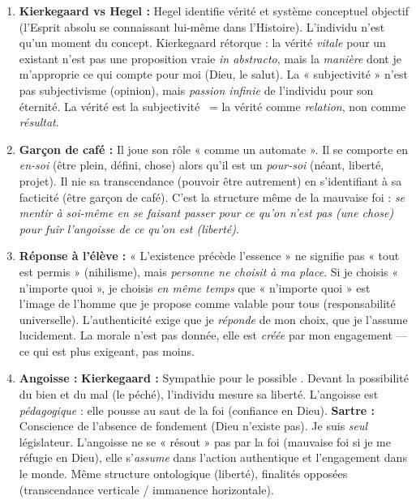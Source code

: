 \documentclass[11pt]{article}
\newcommand{\cle}[1]{{\popxbold\color{popdark}#1}}
\begin{document}
\begin{corrige}
\begin{enumerate}
\item \textbf{Kierkegaard vs Hegel :} Hegel identifie vérité et système conceptuel objectif (l'Esprit absolu se connaissant lui-même dans l'Histoire). L'individu n'est qu'un moment du concept. Kierkegaard rétorque : la vérité \emph{vitale} pour un existant n'est pas une proposition vraie \emph{in abstracto}, mais la \emph{manière} dont je m'approprie ce qui compte pour moi (Dieu, le salut). La « subjectivité » n'est pas subjectivisme (opinion), mais \emph{passion infinie} de l'individu pour son éternité. \guillemotleft La vérité est la subjectivité \guillemotright\ = la vérité comme \emph{relation}, non comme \emph{résultat}.
\item \textbf{Garçon de café :} Il joue son rôle « comme un automate ». Il se comporte en \emph{en-soi} (être plein, défini, chose) alors qu'il est un \emph{pour-soi} (néant, liberté, projet). Il nie sa \cle{transcendance} (pouvoir être autrement) en s'identifiant à sa \cle{facticité} (être garçon de café). C'est la structure même de la mauvaise foi : \emph{se mentir à soi-même en se faisant passer pour ce qu'on n'est pas (une chose) pour fuir l'angoisse de ce qu'on est (liberté)}.
\item \textbf{Réponse à l'élève :} « L'existence précède l'essence » ne signifie pas « tout est permis » (nihilisme), mais \emph{personne ne choisit à ma place}. Si je choisis « n'importe quoi », je choisis \emph{en même temps} que « n'importe quoi » est l'image de l'homme que je propose comme valable pour tous (responsabilité universelle). L'authenticité exige que je \emph{réponde} de mon choix, que je l'assume lucidement. La morale n'est pas donnée, elle est \emph{créée} par mon engagement — ce qui est plus exigeant, pas moins.
\item \textbf{Angoisse :} \textbf{Kierkegaard :} \guillemotleft Sympathie pour le possible \guillemotright. Devant la possibilité du bien et du mal (le péché), l'individu mesure sa liberté. L'angoisse est \emph{pédagogique} : elle pousse au saut de la foi (confiance en Dieu). \textbf{Sartre :} Conscience de l'absence de fondement (Dieu n'existe pas). Je suis \emph{seul} législateur. L'angoisse ne se « résout » pas par la foi (mauvaise foi si je me réfugie en Dieu), elle s'\emph{assume} dans l'action authentique et l'engagement dans le monde. Même structure ontologique (liberté), finalités opposées (transcendance verticale / immanence horizontale).
\end{enumerate}
\end{corrige}
\end{document}
